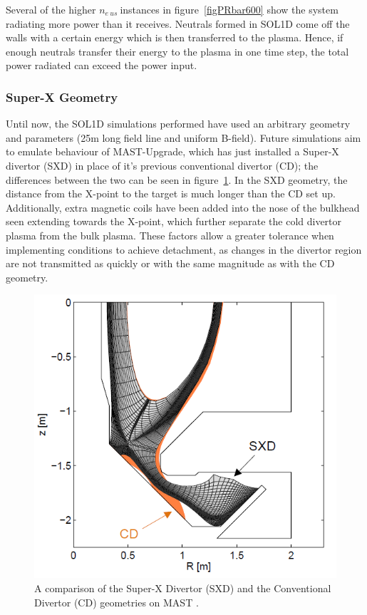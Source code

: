 \documentclass[11pt]{article}  %
\providecommand{\neus}{$n_{e~us}~$} %
\begin{document}
Several of the higher \neus instances in figure~\ref{figPRbar600} show the system radiating more power than it receives. Neutrals formed in SOL1D come off the walls with a certain energy which is then transferred to the plasma. Hence, if enough neutrals transfer their energy to the plasma in one time step, the total power radiated can exceed the power input.

\subsubsection{Super-X Geometry}\label{sssecSXG}
Until now, the SOL1D simulations performed have used an arbitrary geometry and parameters (25m long field line and uniform B-field). Future simulations aim to emulate behaviour of MAST-Upgrade, which has just installed a Super-X divertor (SXD) in place of it's previous conventional divertor (CD); the differences between the two can be seen in figure~\ref{figCDvsSXD}. In the SXD geometry, the distance from the X-point to the target is much longer than the CD set up. Additionally, extra magnetic coils have been added into the nose of the bulkhead seen extending towards the X-point, which further separate the cold divertor plasma from the bulk plasma. These factors allow a greater tolerance when implementing conditions to achieve detachment, as changes in the divertor region are not transmitted as quickly or with the same magnitude as with the CD geometry.

\begin{figure}
\includegraphics[scale=0.5]{Figures/CDvsSXD.png}
\centering
\caption{A comparison of the Super-X Divertor (SXD) and the Conventional Divertor (CD) geometries on MAST \cite{Havlickova2014}.}\label{figCDvsSXD}
\end{figure}
\end{document}
